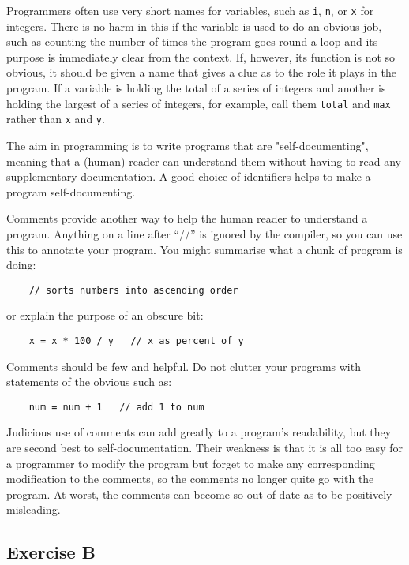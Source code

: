 Programmers often use very short names for variables, such as
\verb!i!, \verb!n!, or 
\verb!x! for integers.  There is no harm in this if the variable is used to
do an obvious job, such as counting the number of times the program goes round
a loop and its purpose is immediately clear from the context.  If, however, its
function is not so obvious, it should be given a name that
gives a clue as to the role it plays in the program.  If a variable is
holding the total of a series of integers and another is holding the
largest of a series of integers, for example, call them \verb!total!
and \verb!max! rather than \verb!x! and \verb!y!.

The aim in programming is to write programs that are "self-documenting",
meaning that a (human) reader can understand them without having to read
any supplementary documentation.  A good choice of identifiers helps to
make a program self-documenting.

Comments provide another way to help the human reader to understand a
program.  Anything on a line after ``//'' is ignored by the compiler,
so you can use this to annotate your program.  You might summarise
what a chunk of program is doing:

\begin{Verbatim}
    // sorts numbers into ascending order
\end{Verbatim}

or explain the purpose of an obscure bit:

\begin{Verbatim}
    x = x * 100 / y   // x as percent of y
\end{Verbatim}

Comments should be few and helpful.  Do not clutter your programs with
statements of the obvious such as:

\begin{Verbatim}
    num = num + 1   // add 1 to num
\end{Verbatim}

Judicious use of comments can add greatly to a program's readability, but they
are second best to self-documentation.  Their weakness is that it is all too
easy for a programmer to modify the program but forget to make any
corresponding modification to the comments, so the comments no longer quite
go with the program.  At worst, the comments can become so out-of-date as
to be positively misleading.

\subsection*{Exercise B}


